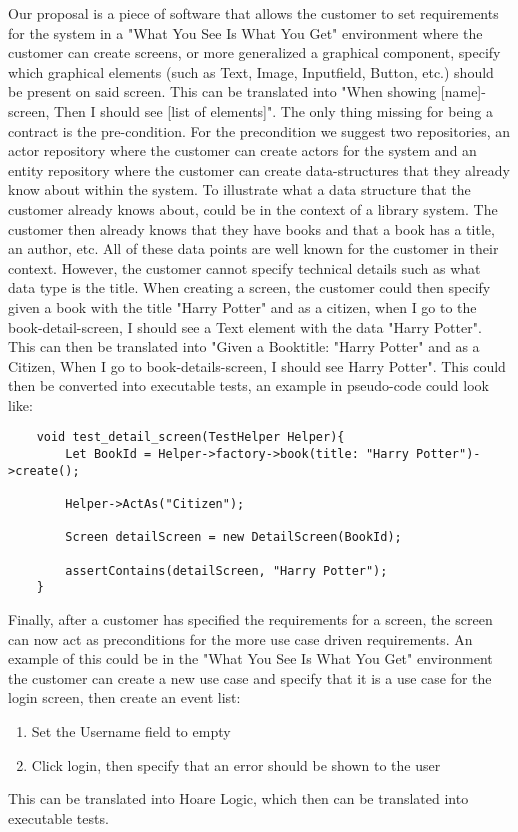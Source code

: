Our proposal is a piece of software that allows the customer to set requirements for the system in a "What You See Is What You Get" environment where the customer can create screens, or more generalized a graphical component, specify which graphical elements (such as Text, Image, Inputfield, Button, etc.) should be present on said screen. 
This can be translated into "When showing [name]-screen, Then I should see [list of elements]".
The only thing missing for being a contract is the pre-condition.
For the precondition we suggest two repositories, an actor repository where the customer can create actors for the system and an entity repository where the customer can create data-structures that they already know about within the system. 
To illustrate what a data structure that the customer already knows about, could be in the context of a library system.
The customer then already knows that they have books and that a book has a title, an author, etc. 
All of these data points are well known for the customer in their context. 
However, the customer cannot specify technical details such as what data type is the title.
When creating a screen, the customer could then specify given a book with the title "Harry Potter" and as a citizen, when I go to the book-detail-screen, I should see a Text element with the data "Harry Potter". 
This can then be translated into "Given a Book{title: "Harry Potter"} and as a Citizen, When I go to book-details-screen, I should see Harry Potter".
This could then be converted into executable tests, an example in pseudo-code could look like:

\begin{lstlisting}
    void test_detail_screen(TestHelper Helper){
        Let BookId = Helper->factory->book(title: "Harry Potter")->create();

        Helper->ActAs("Citizen");

        Screen detailScreen = new DetailScreen(BookId);

        assertContains(detailScreen, "Harry Potter");
    }
\end{lstlisting}

Finally, after a customer has specified the requirements for a screen, the screen can now act as preconditions for the more use case driven requirements. 
An example of this could be in the "What You See Is What You Get" environment the customer can create a new use case and specify that it is a use case for the login screen, then create an event list: 
\begin{enumerate}
    \item Set the Username field to empty
    \item Click login, then specify that an error should be shown to the user
\end{enumerate}

This can be translated into Hoare Logic, which then can be translated into executable tests.
